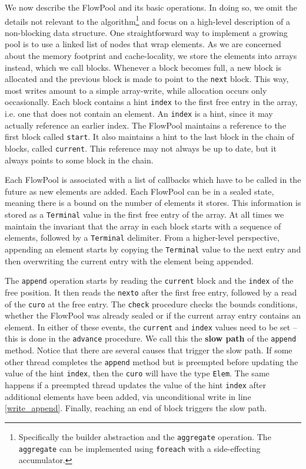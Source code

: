 \documentclass[runningheads,a4paper]{llncs}
\begin{document}
We now describe the FlowPool and its basic operations.
In doing so, we omit the details not relevant to the
algorithm\footnote{Specifically the builder abstraction and the \texttt{aggregate}
operation. The \texttt{aggregate} can be implemented using \texttt{foreach}
with a side-effecting accumulator.}
and focus on a high-level description of a non-blocking
data structure.
One straightforward way to implement a growing pool is to use a linked
list of nodes that wrap elements.
As we are concerned about the memory footprint and cache-locality, we
store the elements into arrays instead, which we call blocks.
Whenever a block becomes full, a new block is allocated and the
previous block is made to point to the \verb=next= block.
This way, most writes amount to a simple array-write, while allocation
occurs only occasionally.
Each block contains a hint \verb=index= to the first free entry in
the array, i.e. one that does not contain an element.
An \verb=index= is a hint, since it may actually reference an earlier index.
The FlowPool maintains a reference to the first block called
\verb=start=.
It also maintains a hint to the last block in the chain of blocks,
called \verb=current=.
This reference may not always be up to date, but it always points
to some block in the chain.

Each FlowPool is associated with a list of callbacks which have
to be called in the future as new elements are added.
Each FlowPool can be in a sealed state, meaning there is a bound on
the number of elements it stores.
This information is stored as a \verb=Terminal= value in the first
free entry of the array.
At all times we maintain the invariant that the array in each block
starts with a sequence of elements, followed by a \verb=Terminal=
delimiter. From a higher-level perspective, appending an element
starts by copying the \verb=Terminal= value to the next entry and then
overwriting the current entry with the element being appended.

The \verb=append= operation starts by reading the \verb=current= block
and the \verb=index= of the free position.
It then reads the
\verb=nexto= after the first free entry, followed by a read of the
\verb=curo= at the free entry.
The \verb=check= procedure checks the bounds conditions, whether the
FlowPool was already sealed or if the current array entry contains an
element.
In either of these events, the \verb=current= and \verb=index= values
need to be set -- this is done in the \verb=advance= procedure.
We call this the \textbf{slow path} of the \verb=append= method.
Notice that there are several causes that trigger the slow path.
If some other thread completes the \verb=append= method but is
preempted before updating the value of the hint \verb=index=, then the
\verb=curo= will have the type \verb=Elem=.
The same happens if a preempted thread updates the value of the
hint \verb=index= after additional elements have been added,
via unconditional write in line \ref{write_append}.
Finally, reaching an end of block triggers the slow path.
\end{document}
